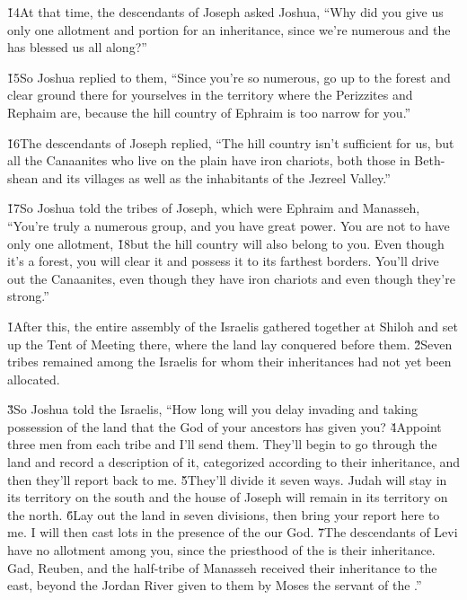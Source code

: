 \v{14}At that time, the descendants of Joseph asked Joshua, ``Why did you give us only one allotment and portion for an inheritance, since we're numerous and the  has blessed us all along?''

\v{15}So Joshua replied to them, ``Since you're so numerous, go up to the forest and clear ground there for yourselves in the territory where the Perizzites and Rephaim are, because the hill country of Ephraim is too narrow for you.''

\v{16}The descendants of Joseph replied, ``The hill country isn't sufficient for us, but all the Canaanites who live on the plain have iron chariots, both those in Beth-shean and its villages as well as the inhabitants of the Jezreel Valley.''

\v{17}So Joshua told the tribes of Joseph, which were Ephraim and Manasseh, ``You're truly a numerous group, and you have great power. You are not to have only one allotment, \v{18}but the hill country will also belong to you. Even though it's a forest, you will clear it and possess it to its farthest borders. You'll drive out the Canaanites, even though they have iron chariots and even though they're strong.''

\v{1}After this, the entire assembly of the Israelis gathered together at Shiloh and set up the Tent of Meeting there, where the land lay conquered before them. \v{2}Seven tribes remained among the Israelis for whom their inheritances had not yet been allocated.

\v{3}So Joshua told the Israelis, ``How long will you delay invading and taking possession of the land that the  God of your ancestors has given you? \v{4}Appoint three men from each tribe and I'll send them. They'll begin to go through the land and record a description of it, categorized according to their inheritance, and then they'll report back to me. \v{5}They'll divide it seven ways. Judah will stay in its territory on the south and the house of Joseph will remain in its territory on the north. \v{6}Lay out the land in seven divisions, then bring your report here to me. I will then cast lots in the presence of the  our God. \v{7}The descendants of Levi have no allotment among you, since the priesthood of the  is their inheritance. Gad, Reuben, and the half-tribe of Manasseh received their inheritance to the east, beyond the Jordan River given to them by Moses the servant of the .''


